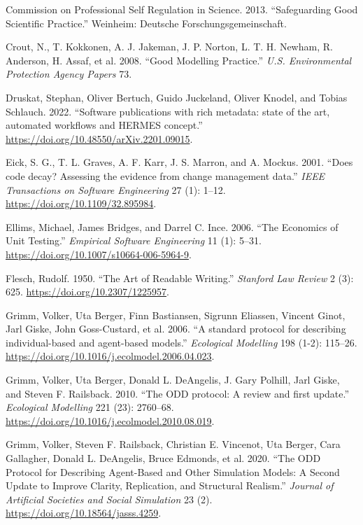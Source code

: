 \documentclass[preprint,11pt,5p]{elsarticle}
\newlength{\cslhangindent}
\newenvironment{CSLReferences}[2] %
{\begin{list}{}{%
	\setlength{\itemindent}{0pt}
	\setlength{\leftmargin}{0pt}
	\setlength{\parsep}{0pt}
	\ifodd #1
	\setlength{\leftmargin}{\cslhangindent}
	\setlength{\itemindent}{-1\cslhangindent}
	\fi
	\setlength{\itemsep}{#2\baselineskip}}}
{\end{list}}
\begin{document}
\begin{CSLReferences}{1}{0}
Commission on Professional Self Regulation in Science. 2013.
{``{Safeguarding Good Scientific Practice}.''} Weinheim: Deutsche
Forschungsgemeinschaft.

Crout, N., T. Kokkonen, A. J. Jakeman, J. P. Norton, L. T. H. Newham, R.
Anderson, H. Assaf, et al. 2008. {``{Good Modelling Practice}.''}
\emph{U.S. Environmental Protection Agency Papers} 73.

Druskat, Stephan, Oliver Bertuch, Guido Juckeland, Oliver Knodel, and
Tobias Schlauch. 2022. {``{Software publications with rich metadata:
state of the art, automated workflows and HERMES concept}.''}
\url{https://doi.org/10.48550/arXiv.2201.09015}.

Eick, S. G., T. L. Graves, A. F. Karr, J. S. Marron, and A. Mockus.
2001. {``{Does code decay? Assessing the evidence from change management
data}.''} \emph{IEEE Transactions on Software Engineering} 27 (1):
1--12. \url{https://doi.org/10.1109/32.895984}.

Ellims, Michael, James Bridges, and Darrel C. Ince. 2006. {``{The
Economics of Unit Testing}.''} \emph{Empirical Software Engineering} 11
(1): 5--31. \url{https://doi.org/10.1007/s10664-006-5964-9}.

Flesch, Rudolf. 1950. {``{The Art of Readable Writing}.''}
\emph{Stanford Law Review} 2 (3): 625.
\url{https://doi.org/10.2307/1225957}.

Grimm, Volker, Uta Berger, Finn Bastiansen, Sigrunn Eliassen, Vincent
Ginot, Jarl Giske, John Goss-Custard, et al. 2006. {``{A standard
protocol for describing individual-based and agent-based models}.''}
\emph{Ecological Modelling} 198 (1-2): 115--26.
\url{https://doi.org/10.1016/j.ecolmodel.2006.04.023}.

Grimm, Volker, Uta Berger, Donald L. DeAngelis, J. Gary Polhill, Jarl
Giske, and Steven F. Railsback. 2010. {``{The ODD protocol: A review and
first update}.''} \emph{Ecological Modelling} 221 (23): 2760--68.
\url{https://doi.org/10.1016/j.ecolmodel.2010.08.019}.

Grimm, Volker, Steven F. Railsback, Christian E. Vincenot, Uta Berger,
Cara Gallagher, Donald L. DeAngelis, Bruce Edmonds, et al. 2020. {``{The
ODD Protocol for Describing Agent-Based and Other Simulation Models: A
Second Update to Improve Clarity, Replication, and Structural
Realism}.''} \emph{Journal of Artificial Societies and Social
Simulation} 23 (2). \url{https://doi.org/10.18564/jasss.4259}.


\end{CSLReferences}
\end{document}
